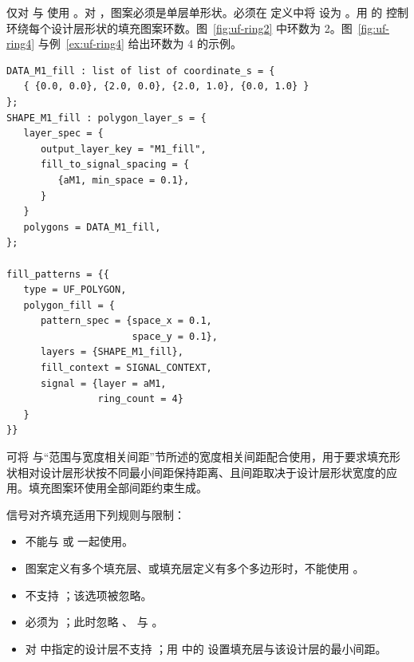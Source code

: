 
仅对  与  使用 。对 ，图案必须是单层单形状。必须在  定义中将  设为 。用  的  控制环绕每个设计层形状的填充图案环数。图~\ref{fig:uf-ring2} 中环数为 2。图~\ref{fig:uf-ring4} 与例~\ref{ex:uf-ring4} 给出环数为 4 的示例。


\begin{lstlisting}[style=pxl,caption={ring\_count = 4 的填充},label={ex:uf-ring4}]
DATA_M1_fill : list of list of coordinate_s = {
   { {0.0, 0.0}, {2.0, 0.0}, {2.0, 1.0}, {0.0, 1.0} }
};
SHAPE_M1_fill : polygon_layer_s = {
   layer_spec = {
      output_layer_key = "M1_fill",
      fill_to_signal_spacing = {
         {aM1, min_space = 0.1},
      }
   }
   polygons = DATA_M1_fill,
};

fill_patterns = {{
   type = UF_POLYGON,
   polygon_fill = {
      pattern_spec = {space_x = 0.1,
                      space_y = 0.1},
      layers = {SHAPE_M1_fill},
      fill_context = SIGNAL_CONTEXT,
      signal = {layer = aM1,
                ring_count = 4}
   }
}}
\end{lstlisting}

可将  与“范围与宽度相关间距”节所述的宽度相关间距配合使用，用于要求填充形状相对设计层形状按不同最小间距保持距离、且间距取决于设计层形状宽度的应用。填充图案环使用全部间距约束生成。

信号对齐填充适用下列规则与限制：
\begin{itemize}
  \item {} 不能与  或  一起使用。
  \item 图案定义有多个填充层、或填充层定义有多个多边形时，不能使用 。
  \item 不支持 ；该选项被忽略。
  \item {} 必须为 ；此时忽略 、 与 。
  \item 对  中指定的设计层不支持 ；用  中的  设置填充层与该设计层的最小间距。
\end{itemize}

